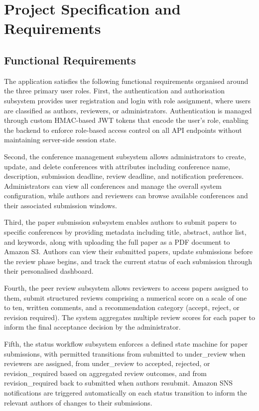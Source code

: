 \documentclass[conference]{IEEEtran}
\begin{document}
\section{Project Specification and Requirements}

\subsection{Functional Requirements}

The application satisfies the following functional requirements organised around the three primary user roles. First, the authentication and authorisation subsystem provides user registration and login with role assignment, where users are classified as authors, reviewers, or administrators. Authentication is managed through custom HMAC-based JWT tokens that encode the user's role, enabling the backend to enforce role-based access control on all API endpoints without maintaining server-side session state.

Second, the conference management subsystem allows administrators to create, update, and delete conferences with attributes including conference name, description, submission deadline, review deadline, and notification preferences. Administrators can view all conferences and manage the overall system configuration, while authors and reviewers can browse available conferences and their associated submission windows.

Third, the paper submission subsystem enables authors to submit papers to specific conferences by providing metadata including title, abstract, author list, and keywords, along with uploading the full paper as a PDF document to Amazon S3. Authors can view their submitted papers, update submissions before the review phase begins, and track the current status of each submission through their personalised dashboard.

Fourth, the peer review subsystem allows reviewers to access papers assigned to them, submit structured reviews comprising a numerical score on a scale of one to ten, written comments, and a recommendation category (accept, reject, or revision required). The system aggregates multiple review scores for each paper to inform the final acceptance decision by the administrator.

Fifth, the status workflow subsystem enforces a defined state machine for paper submissions, with permitted transitions from submitted to under\_review when reviewers are assigned, from under\_review to accepted, rejected, or revision\_required based on aggregated review outcomes, and from revision\_required back to submitted when authors resubmit. Amazon SNS notifications are triggered automatically on each status transition to inform the relevant authors of changes to their submissions.
\end{document}
